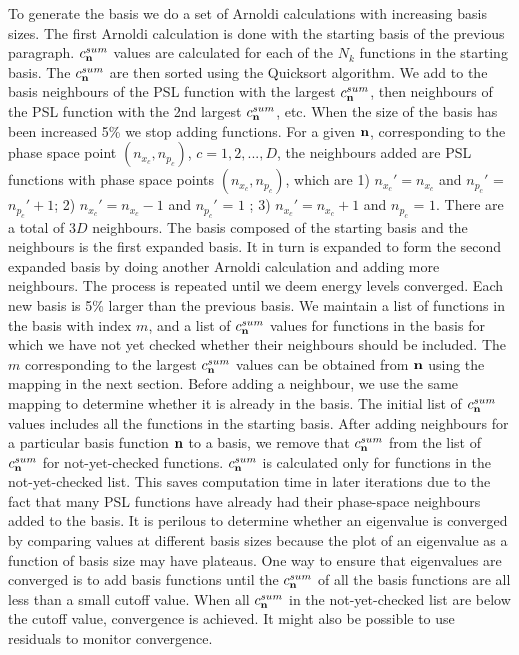 To generate the basis we do a set of Arnoldi calculations with increasing basis sizes.  The first Arnoldi calculation is done with the starting basis of the 
previous paragraph.      $c_{{\bf{n}}}^{sum}$ values are  calculated for each of  the $N_k$ functions in the starting basis.
  The   $c_{{\bf{n}}}^{sum}$     are then sorted using the Quicksort algorithm. \cite{Hoare1961}  
%
 We  add  to the basis neighbours of 
the PSL function with the largest  $c_{{\bf{n}}}^{sum}$, then neighbours of the PSL function with the 2nd largest  $c_{{\bf{n}}}^{sum}$, etc.  
When the size of the basis has been increased 5\% we stop adding functions.   
For a given ${\bf{n}}$, corresponding to   the phase space point $(n_{x_c}, n_{p_c})$, $c=1,2,...,D$, %
 the neighbours added  are  PSL functions  
with phase space points  $(n_{x_c}, n_{p_c})$, which are 
 1)    $n_{x_c}' = n_{x_c}$   and   $ n_{p_c}'$     
=  $n_{p_c}'+1$;
 2)    $n_{x_c}' = n_{x_c}-1$  and  $ n_{p_c}'$  =  $1$ ;
 3)   $n_{x_c}' = n_{x_c} +1$   and  $ n_{p_c}$  =  $1$.  
There are a total of $3 D$   neighbours.  
%
The basis composed of the starting basis and the    neighbours is the first expanded basis.  It  in turn is expanded to form the second expanded basis 
by doing another Arnoldi calculation and adding more neighbours.   The   process is repeated until we deem energy levels converged.   Each new basis is  
 5\% larger than the previous basis. 
%
We maintain a list of functions in the basis with index $m$,  and a list of $c_{{\bf{n}}}^{sum}$ values for functions in the basis for which we have not yet checked whether their neighbours should be included.  
%
   The $m$ corresponding to the largest $c_{{\bf{n}}}^{sum}$ values can be obtained from ${{\bf{n}}}$ using the mapping in the next section.      
  Before adding a neighbour, we use the same  mapping  to determine whether   it is  already in the basis.   
The initial list  of $c_{{\bf{n}}}^{sum}$ values 
 includes   
all the  functions in the starting basis.     
% 
%
%
%
After adding     neighbours   for a particular basis function ${{\bf n}}$   to a  basis, 
we remove that     $c_{{\bf{n}}}^{sum}$   %
 from the list of  $c_{{\bf{n}}}^{sum}$   for    not-yet-checked functions. 
 $c_{{\bf{n}}}^{sum}$ is calculated only for functions in the not-yet-checked list.
 This saves  computation time  in later  iterations due to the fact that many   PSL functions  have already had  their  phase-space neighbours added to the  basis. 
%  
%
%
It is perilous to determine  whether an eigenvalue is converged by comparing values at different basis sizes because the plot of an eigenvalue as a function of basis size 
may have plateaus.  
One way to ensure that eigenvalues are converged is to add basis functions until    the  $c_{{{\bf n}}}^{sum}$  of all the basis functions are all less than a small cutoff value.
  When  all $c_{{{\bf n}}}^{sum}$ in the not-yet-checked  list are below the  cutoff 
value, convergence is    achieved.
%
It might also be possible to use residuals to monitor convergence.  








